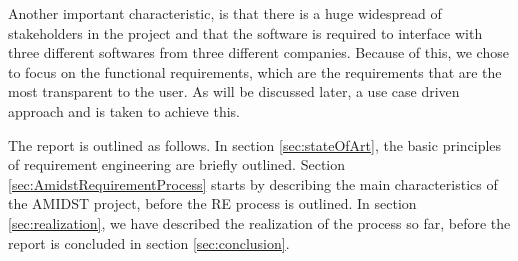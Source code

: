 Another important characteristic, is that there is a huge widespread of stakeholders in the project and that the software is required to interface with three different softwares from three different companies.  Because of this, we chose to focus on the functional requirements, which are the requirements that are the most transparent to the user.  As will be discussed later, a use case driven approach \cite{Poh10} and \cite{Coc01} is taken to achieve this.

The report is outlined as follows.  In section \ref{sec:stateOfArt}, the basic principles of requirement engineering are briefly outlined.  Section \ref{sec:AmidstRequirementProcess} starts by describing the main characteristics of the AMIDST project, before the RE process is outlined.  In section \ref{sec:realization}, we have described the realization of the process so far, before the report is concluded in section \ref{sec:conclusion}.
